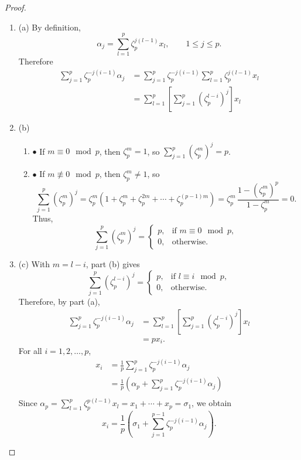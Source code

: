 \documentclass[11pt,a4paper]{article}
\newcommand{\be} {\begin{enumerate}}
\newcommand{\ee} {\end{enumerate}}
\begin{document}
\begin{proof}
\be
\item[(a)] By definition,
$$\alpha_j = \sum_{l=1}^p \zeta_p^{j(l-1)}x_l, \qquad 1\leq j \leq p.$$
Therefore
\begin{align*}
\sum_{j=1}^p \zeta_p^{-j(i-1)}\alpha_j &= \sum_{j=1}^p \zeta_p^{-j(i-1)} \sum_{l=1}^p \zeta_p^{j(l-1)}x_l\\
&= \sum_{l=1}^p \left [\sum_{j=1}^p( \zeta_p^{l-i})^j  \right ] x_l
\end{align*}

\item[(b)]
  \be
  \item[$\bullet$] If $m\equiv 0 \mod p$, then $\zeta_p^m = 1$, so $\sum\limits_{j=1}^p (\zeta_p^m)^j = p$.
  \item[$\bullet$] If $m\not \equiv 0 \mod p$, then $\zeta_p^m  \ne 1$, so
  $$\sum_{j=1}^p (\zeta_p^m)^j  =\zeta_p^m(1+\zeta_p^m+ \zeta_p^{2m}+ \cdots+ \zeta_p^{(p-1)m}) = \zeta_p^m \, \frac{1- (\zeta_p^{m})^p}{1 - \zeta_p^m} = 0.
  $$
  Thus,
  $$
\sum_{j=1}^p (\zeta_p^m)^j =
\left\{
\begin{array}{ll}
 p, &  \text{if }m\equiv 0 \mod p,    \\
 0, &  \text{otherwise}.   
\end{array}
\right.
$$
  \ee
  
\item[(c)] With $m=l-i$, part (b) gives
$$ \sum_{j=1}^p( \zeta_p^{l-i})^j =
\left\{
\begin{array}{ll}
 p, &  \text{if } l\equiv i \mod p,    \\
 0, &  \text{otherwise}.   
\end{array}
\right.
$$
Therefore, by part (a),
\begin{align*}
\sum_{j=1}^p \zeta_p^{-j(i-1)}\alpha_j &= \sum_{l=1}^p \left [\sum_{j=1}^p( \zeta_p^{l-i})^j  \right ] x_l\\
&= p x_i.
\end{align*}
For all $i=1,2,\ldots,p$,
\begin{align*}
x_i &= \frac{1}{p} \sum_{j=1}^p \zeta_p^{-j(i-1)}\alpha_j \\
&=\frac{1}{p} \left (\alpha_p +  \sum_{j=1}^p \zeta_p^{-j(i-1)}\alpha_j \right)\\
\end{align*}
Since $ \alpha_p =  \sum_{l=1}^p \zeta_p^{p(l-1)}x_l = x_1+\cdots+x_p = \sigma_1$, we obtain
$$x_i = \frac{1}{p}\left( \sigma_1 + \sum_{j=1}^{p-1} \zeta_p^{-j(i-1)} \alpha_j \right).$$
\ee
\end{proof}
\end{document}
